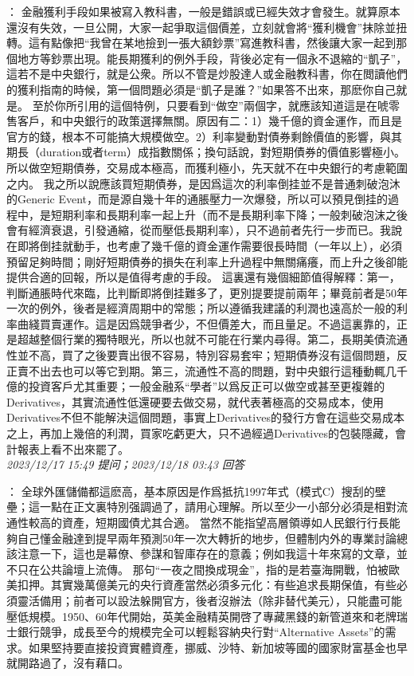 \documentclass[twocolumn]{ctexart}
\begin{document}
：
金融獲利手段如果被寫入教科書，一般是錯誤或已經失效才會發生。就算原本還沒有失效，一旦公開，大家一起爭取這個價差，立刻就會將“獲利機會”抹除並扭轉。這有點像把“我曾在某地撿到一張大額鈔票”寫進教科書，然後讓大家一起到那個地方等鈔票出現。能長期獲利的例外手段，背後必定有一個永不退縮的“凱子”，這若不是中央銀行，就是公衆。所以不管是炒股達人或金融教科書，你在閲讀他們的獲利指南的時候，第一個問題必須是“凱子是誰？”如果答不出來，那麽你自己就是。
至於你所引用的這個特例，只要看到“做空”兩個字，就應該知道這是在唬零售客戶，和中央銀行的政策選擇無關。原因有二：1）幾千億的資金運作，而且是官方的錢，根本不可能搞大規模做空。2）利率變動對債券剩餘價值的影響，與其期長（duration或者term）成指數關係；換句話說，對短期債券的價值影響極小。所以做空短期債券，交易成本極高，而獲利極小，先天就不在中央銀行的考慮範圍之内。
我之所以說應該買短期債券，是因爲這次的利率倒挂並不是普通刺破泡沐的Generic Event，而是源自幾十年的通脹壓力一次爆發，所以可以預見倒挂的過程中，是短期利率和長期利率一起上升（而不是長期利率下降；一般刺破泡沫之後會有經濟衰退，引發通縮，從而壓低長期利率），只不過前者先行一步而已。我說在即將倒挂就動手，也考慮了幾千億的資金運作需要很長時間（一年以上），必須預留足夠時間；剛好短期債券的損失在利率上升過程中無關痛癢，而上升之後卻能提供合適的回報，所以是值得考慮的手段。
這裏還有幾個細節值得解釋：第一，判斷通脹時代來臨，比判斷即將倒挂難多了，更別提要提前兩年；畢竟前者是50年一次的例外，後者是經濟周期中的常態；所以遵循我建議的利潤也遠高於一般的利率曲綫買賣運作。這是因爲競爭者少，不但價差大，而且量足。不過這裏靠的，正是超越整個行業的獨特眼光，所以也就不可能在行業内尋得。第二，長期美債流通性並不高，買了之後要賣出很不容易，特別容易套牢；短期債券沒有這個問題，反正賣不出去也可以等它到期。第三，流通性不高的問題，對中央銀行這種動輒几千億的投資客戶尤其重要；一般金融系“學者”以爲反正可以做空或甚至更複雜的Derivatives，其實流通性低還硬要去做交易，就代表著極高的交易成本，使用Derivatives不但不能解決這個問題，事實上Derivatives的發行方會在這些交易成本之上，再加上幾倍的利潤，買家吃虧更大，只不過經過Derivatives的包裝隱藏，會計報表上看不出來罷了。
\\

\textit{\hfill\noindent\small 2023/12/17 15:49 提问；2023/12/18 03:43 回答}

：
全球外匯儲備都這麽高，基本原因是作爲抵抗1997年式（模式C）搜刮的壁壘；這一點在正文裏特別强調過了，請用心理解。所以至少一小部分必須是相對流通性較高的資產，短期國債尤其合適。
當然不能指望高層領導如人民銀行行長能夠自己懂金融達到提早兩年預測50年一次大轉折的地步，但體制内外的專業討論總該注意一下，這也是幕僚、參謀和智庫存在的意義；例如我這十年來寫的文章，並不只在公共論壇上流傳。
那句“一夜之間換成現金”，指的是若臺海開戰，怕被歐美扣押。其實幾萬億美元的央行資產當然必須多元化：有些追求長期保值，有些必須靈活備用；前者可以設法躲開官方，後者沒辦法（除非替代美元），只能盡可能壓低規模。1950、60年代開始，英美金融精英開啓了專藏黑錢的新管道來和老牌瑞士銀行競爭，成長至今的規模完全可以輕鬆容納央行對“Alternative Assets”的需求。如果堅持要直接投資實體資產，挪威、沙特、新加坡等國的國家財富基金也早就開路過了，沒有藉口。
\\
\end{document}
